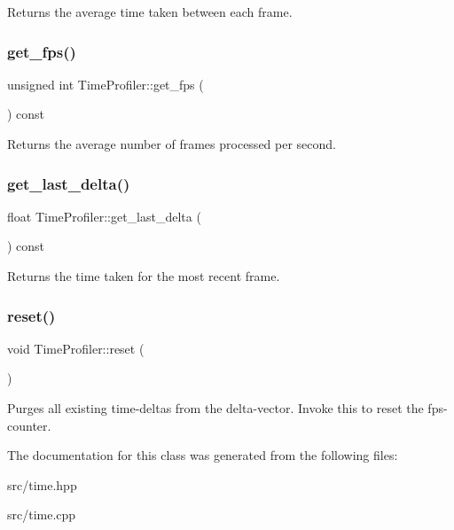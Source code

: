 Returns the average time taken between each frame. \mbox{\label{class_time_profiler_a49dc639e9dd12ee6313707722f7e8ffe}} 
\subsubsection{\texorpdfstring{get\+\_\+fps()}{get\_fps()}}
{\footnotesize\ttfamily unsigned int Time\+Profiler\+::get\+\_\+fps (\begin{DoxyParamCaption}{ }\end{DoxyParamCaption}) const}

Returns the average number of frames processed per second. \mbox{\label{class_time_profiler_a44468954e79b02942fb168b6597280a1}} 
\subsubsection{\texorpdfstring{get\+\_\+last\+\_\+delta()}{get\_last\_delta()}}
{\footnotesize\ttfamily float Time\+Profiler\+::get\+\_\+last\+\_\+delta (\begin{DoxyParamCaption}{ }\end{DoxyParamCaption}) const}

Returns the time taken for the most recent frame. \mbox{\label{class_time_profiler_aaaccee940365a619c03f1f69a46803e4}} 
\subsubsection{\texorpdfstring{reset()}{reset()}}
{\footnotesize\ttfamily void Time\+Profiler\+::reset (\begin{DoxyParamCaption}{ }\end{DoxyParamCaption})}

Purges all existing time-\/deltas from the delta-\/vector. Invoke this to reset the fps-\/counter. 

The documentation for this class was generated from the following files\+:\begin{DoxyCompactItemize}
\item 
src/time.\+hpp\item 
src/time.\+cpp\end{DoxyCompactItemize}
